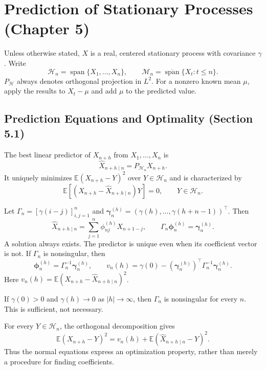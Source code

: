 \section{Prediction of Stationary Processes (Chapter 5)}
\label{sec:tmts-ch5}
Unless otherwise stated, $X$ is a real, centered stationary process with
covariance $\gamma$. Write
\[
\mathcal H_n=\operatorname{span}\{X_1,\ldots,X_n\},\qquad
\mathcal M_n=\overline{\operatorname{span}}\{X_t:t\le n\}.
\]
$P_{\mathcal H}$ always denotes orthogonal projection in $L^2$.
For a nonzero known mean $\mu$, apply the results to $X_t-\mu$ and add
$\mu$ to the predicted value.

\subsection{Prediction Equations and Optimality (Section 5.1)}
\begin{definition}
The best linear predictor of $X_{n+h}$ from $X_1,\ldots,X_n$ is
\[
\widehat X_{n+h\mid n}=P_{\mathcal H_n}X_{n+h}.
\]
It uniquely minimizes $\mathbb E(X_{n+h}-Y)^2$ over $Y\in\mathcal H_n$
and is characterized by
\[
\mathbb E[(X_{n+h}-\widehat X_{n+h\mid n})Y]=0,
\qquad Y\in\mathcal H_n.
\]
\end{definition}
\begin{theorem}
Let $\Gamma_n=[\gamma(i-j)]_{i,j=1}^n$ and
$\boldsymbol\gamma_n^{(h)}=(\gamma(h),\ldots,\gamma(h+n-1))^\top$.
Then
\[
\widehat X_{n+h\mid n}=\sum_{j=1}^n\phi_{nj}^{(h)}X_{n+1-j},\qquad
\Gamma_n\boldsymbol\phi_n^{(h)}=\boldsymbol\gamma_n^{(h)}.
\]
A solution always exists. The predictor is unique even when its coefficient
vector is not. If $\Gamma_n$ is nonsingular, then
\[
\boldsymbol\phi_n^{(h)}=\Gamma_n^{-1}\boldsymbol\gamma_n^{(h)},\qquad
v_n(h)=\gamma(0)-(\boldsymbol\gamma_n^{(h)})^\top
\Gamma_n^{-1}\boldsymbol\gamma_n^{(h)}.
\]
Here $v_n(h)=\mathbb E(X_{n+h}-\widehat X_{n+h\mid n})^2$.
\end{theorem}
\begin{proposition}
If $\gamma(0)>0$ and $\gamma(h)\to0$ as $|h|\to\infty$, then
$\Gamma_n$ is nonsingular for every $n$. This is sufficient, not necessary.
\end{proposition}
For every $Y\in\mathcal H_n$, the orthogonal decomposition gives
\[
\mathbb E(X_{n+h}-Y)^2=v_n(h)+
\mathbb E(\widehat X_{n+h\mid n}-Y)^2.
\]
Thus the normal equations express an optimization property, rather than
merely a procedure for finding coefficients.

